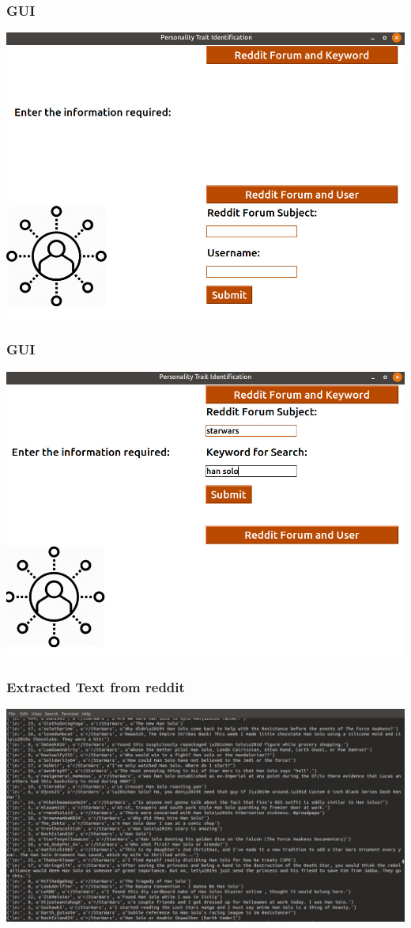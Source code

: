 \documentclass{beamer}
\begin{document}
\begin{frame}
\frametitle{GUI}
\includegraphics[width=\textwidth]{pictures/gui3}
\end{frame}

\begin{frame}
\frametitle{GUI}
\includegraphics[width=\textwidth]{pictures/gui4}
\end{frame}


	\begin{frame}
		\frametitle{Extracted Text from reddit}
		\includegraphics[width=\textwidth]{pictures/crawl1}
	\end{frame}
\end{document}
